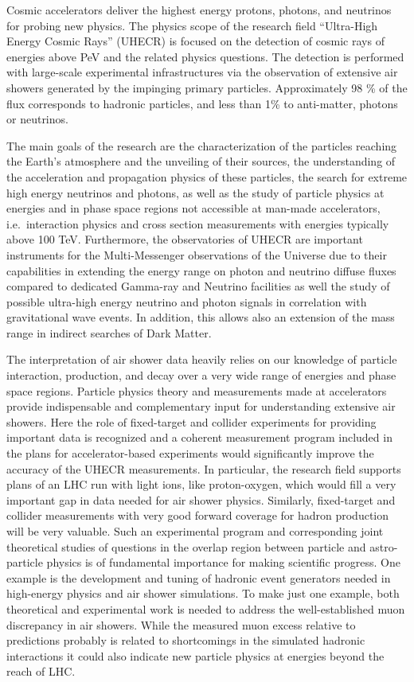 Cosmic accelerators deliver the highest energy protons, photons, and neutrinos for probing new physics. The physics scope of the research field ``Ultra-High Energy Cosmic Rays'' (UHECR) is focused on the detection of 
cosmic rays of energies above PeV and the related physics questions. The detection is performed with 
large-scale experimental infrastructures via the observation of extensive air showers generated by the impinging primary particles. Approximately 98 \% of the flux corresponds to hadronic particles, and less than 1\% to anti-matter, photons or neutrinos.

The main goals of the research are the characterization of the particles reaching the Earth's atmosphere and the unveiling of their sources, the understanding of the acceleration and propagation physics of these particles, 
the search for extreme high energy neutrinos and photons, as well as the study of
particle physics at energies and in phase space regions not accessible at man-made accelerators, i.e.\ interaction physics and cross section measurements with energies typically above 100 TeV. Furthermore, the observatories of UHECR are important instruments for the Multi-Messenger
observations of the Universe due to their capabilities in extending the energy range on photon 
and neutrino diffuse fluxes compared to dedicated Gamma-ray and Neutrino facilities as well the  study of possible ultra-high energy neutrino and photon signals in correlation with gravitational wave events. In addition, this allows  also an extension of the mass range in indirect searches of Dark Matter. 

The interpretation of air shower data heavily relies on our knowledge of particle interaction, production, and decay over a very wide range of energies and phase space regions. Particle physics theory and measurements made at accelerators provide indispensable and complementary input for understanding extensive air showers. 
Here the role of fixed-target and collider experiments for providing important data is recognized and a coherent  measurement program  included in the plans for accelerator-based experiments would significantly improve the accuracy of the UHECR measurements. In particular, the research field supports plans of an LHC
run with light ions, like proton-oxygen, which would fill a very important gap in data needed
for air shower physics. Similarly, fixed-target and collider measurements with very good forward coverage for hadron production will be very valuable. Such an experimental program and corresponding  joint theoretical studies of questions in the overlap region between particle and astro-particle physics is of fundamental importance for making scientific progress. One example is the development and tuning of hadronic event generators needed in high-energy physics and air shower simulations. To make just one example, both theoretical and experimental work is needed to address the well-established muon discrepancy in air showers. While the measured muon excess relative to predictions probably is related to shortcomings in the simulated hadronic interactions it could also indicate new particle physics at energies beyond the reach of LHC.

